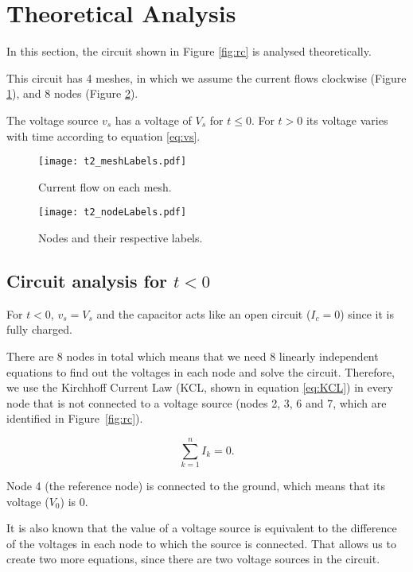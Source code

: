 \section{Theoretical Analysis}
\label{sec:analysis}
\indent

In this section, the circuit shown in Figure \ref{fig:rc} is analysed theoretically.

This circuit has 4 meshes, in which we assume the current flows clockwise (Figure \ref{fig:mesh}), and 8 nodes (Figure \ref{fig:Nodes}).

The voltage source $v_s$ has a voltage of $V_s$ for $t\leq0$.
For $t>0$ its voltage varies with time according to equation \ref{eq:vs}.

\begin{figure}[H] \centering
    \texttt{[image: t2\_meshLabels.pdf]}
    \caption{Current flow on each mesh.}
    \label{fig:mesh}
\end{figure}

\begin{figure}[H] \centering
    \texttt{[image: t2\_nodeLabels.pdf]}
    \caption{Nodes and their respective labels.}
    \label{fig:Nodes}
\end{figure}




\subsection{Circuit analysis for $t<0$}
\label{subsection:circ_analysis}

\indent

For $t<0$, $v_s=V_s$ and the capacitor acts like an open circuit ($I_c=0$) since it is fully charged. 

There are 8 nodes in total which means that we need 8 linearly independent equations to find out the voltages in each node and solve the circuit. Therefore, we use the Kirchhoff Current Law (KCL, shown in equation \ref{eq:KCL}) in every node that is not connected to a voltage source (nodes 2, 3, 6 and 7, which are identified in Figure~\ref{fig:rc}).

\begin{equation}
    \sum_{k=1}^{n} I_k = 0.
    \label{eq:KCL}
\end{equation}

Node 4 (the reference node) is connected to the ground, which means that its voltage ($V_0$) is 0. 

It is also known that the value of a voltage source is equivalent to the difference of the voltages in each node to which the source is connected. That allows us to create two more equations, since there are two voltage sources in the circuit.


